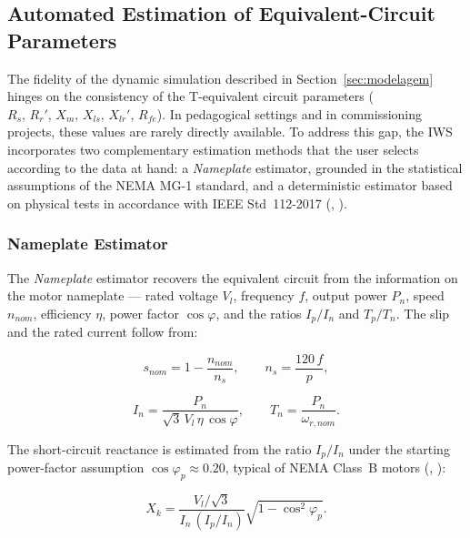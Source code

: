 \documentclass[a4paper]{ifacconf}
\begin{document}
\subsection{Automated Estimation of Equivalent-Circuit Parameters}
\label{subsec:estimation_en}

The fidelity of the dynamic simulation described in Section~\ref{sec:modelagem} hinges on the consistency of the T-equivalent circuit parameters ($R_s,\,R_r',\,X_m,\,X_{ls},\,X_{lr}',\,R_{fe}$). In pedagogical settings and in commissioning projects, these values are rarely directly available. To address this gap, the IWS incorporates two complementary estimation methods that the user selects according to the data at hand: a \textit{Nameplate} estimator, grounded in the statistical assumptions of the NEMA MG-1 standard, and a deterministic estimator based on physical tests in accordance with IEEE Std~112-2017 (\citeauthor{ieee112_2017}, \citeyear{ieee112_2017}).

\subsubsection{Nameplate Estimator}

The \textit{Nameplate} estimator recovers the equivalent circuit from the information on the motor nameplate --- rated voltage $V_l$, frequency $f$, output power $P_n$, speed $n_{nom}$, efficiency $\eta$, power factor $\cos\varphi$, and the ratios $I_p/I_n$ and $T_p/T_n$. The slip and the rated current follow from:

\begin{equation}
\label{eq:nameplate_snom_en}
s_{nom} = 1 - \frac{n_{nom}}{n_s}, \qquad n_s = \frac{120\,f}{p},
\end{equation}

\begin{equation}
\label{eq:nameplate_in_en}
I_n = \frac{P_n}{\sqrt{3}\,V_l\,\eta\,\cos\varphi}, \qquad T_n = \frac{P_n}{\omega_{r,nom}}.
\end{equation}

The short-circuit reactance is estimated from the ratio $I_p/I_n$ under the starting power-factor assumption $\cos\varphi_p \approx 0.20$, typical of NEMA Class~B motors (\citeauthor{li2010simulation}, \citeyear{li2010simulation}):

\begin{equation}
\label{eq:nameplate_xk_en}
X_k = \frac{V_l/\sqrt{3}}{I_n\,(I_p/I_n)}\sqrt{1 - \cos^2\!\varphi_p}.
\end{equation}
\end{document}

